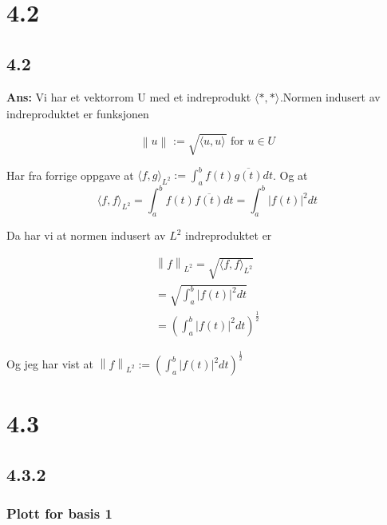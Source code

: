\documentclass[11pt]{article}
\newenvironment{solbox}
  {\begin{mdframed}[linewidth=1pt,linecolor=black,roundcorner=5pt]
   \noindent\textbf{Ans: }\enspace}
  {\end{mdframed}}
\newcommand{\norm}[1]{\left \lVert #1 \right \rVert}
\begin{document}
\section{4.2}

\subsection{4.2}



\begin{solbox}
    Vi har et vektorrom U med et indreprodukt $ \langle *, * \rangle_{  }  $.Normen indusert av indreproduktet er funksjonen 
    
    \[
        \norm{u}_{}^{} := \sqrt{ \langle u, u \rangle_{  }  } \text{ for } u \in U
    \]

    Har fra forrige oppgave at $ \langle f, g \rangle_{ L^2 } := \int_{a}^{b} f(t) \overline{g(t)}dt $. Og at 
    $$ \langle f, f \rangle_{ L^2 } = \int_{a}^{b} f(t) \overline{f(t)}dt  = \int_{a}^{b} \left| f(t) \right| ^2 dt $$

    Da har vi at normen indusert av $ L^2 $ indreproduktet er 


    \begin{align*}
        \norm{f}_{L^2}^{} = \sqrt{ \langle f, f \rangle_{ L^2 } } \\
        = \sqrt{  \int_{a}^{b} \left| f(t) \right| ^2 dt  } \\
        = \left(  \int_{a}^{b} \left| f(t) \right| ^2 dt \right) ^{\frac{1} {2} }
    \end{align*}

    Og jeg har vist at $ \norm{f}_{L^2}^{} := \left(  \int_{a}^{b} \left| f(t) \right| ^2 dt \right) ^{\frac{1} {2} } $ 
    
    
\end{solbox}


\section{4.3}

\subsection{4.3.2}


\subsubsection{Plott for basis 1}
\end{document}
